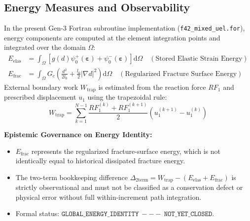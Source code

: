 \documentclass[11pt,a4paper]{article}
\begin{document}
\subsection{Energy Measures and Observability}
In the present Gen-3 Fortran subroutine implementation (\texttt{f42\_mixed\_uel.for}), energy components are computed at the element integration points and integrated over the domain $\Omega$:
\begin{align}
    E_{\mathrm{elas}} &= \int_\Omega \left[ g(d)\psi_0^+(\boldsymbol{\varepsilon}) + \psi_0^-(\boldsymbol{\varepsilon}) \right] \mathrm{d}\Omega \quad (\text{Stored Elastic Strain Energy}) \label{eq:elas_energy} \\
    E_{\mathrm{frac}} &= \int_\Omega G_c \left( \frac{d^2}{2l_0} + \frac{l_0}{2}|\nabla d|^2 \right) \mathrm{d}\Omega \quad (\text{Regularized Fracture Surface Energy}) \label{eq:frac_energy}
\end{align}
External boundary work $W_{\mathrm{trap}}$ is estimated from the reaction force $RF_1$ and prescribed displacement $u_1$ using the trapezoidal rule:
\begin{equation}
    W_{\mathrm{trap}} = \sum_{k=1}^{N-1} \frac{RF_1^{(k)} + RF_1^{(k+1)}}{2} \left( u_1^{(k+1)} - u_1^{(k)} \right)
    \label{eq:wtrap}
\end{equation}

\noindent\textbf{Epistemic Governance on Energy Identity:}
\begin{itemize}[leftmargin=*]
    \item $E_{\mathrm{frac}}$ represents the regularized fracture-surface energy, which is not identically equal to historical dissipated fracture energy.
    \item The two-term bookkeeping difference $\Delta_{\mathrm{2term}} = W_{\mathrm{trap}} - (E_{\mathrm{elas}} + E_{\mathrm{frac}})$ is strictly observational and must not be classified as a conservation defect or physical error without full within-increment path integration.
    \item Formal status: $\mathtt{GLOBAL\_ENERGY\_IDENTITY\ --- \ NOT\_YET\_CLOSED}$.
\end{itemize}
\end{document}
